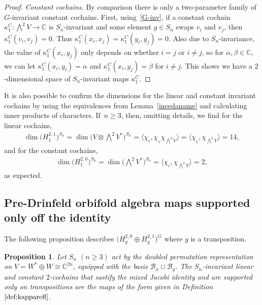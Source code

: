 \documentclass[10pt,a4paper]{amsart}
\numberwithin{equation}{section}
\newtheorem{Proposition}[Theorem]{Proposition}
 { \theoremstyle{definition}
\newtheorem{Definition}[Theorem]{Definition}
\newtheorem{Remark}[Theorem]{Remark}
\newtheorem{case}{Case}}
\begin{document}
\begin{proof}
\textit{Constant cochains.}
By comparison there is only a two-parameter family of $G$-invariant constant cochains.
First, using~\eqref{G-inv}, if a constant cochain $\kappa_1^C\colon \bigwedge^2 V\to \mathbb{C}$ is
$S_n$-invariant and some element $g \in S_n$ swaps $v_i$ and $v_j$, then $\kappa_1^C(v_i,v_j)=0$.
Thus $\kappa_1^C(x_i,x_j)=\kappa_1^C(y_i,y_j)=0$.
Also due to $S_n$-invariance, the value of $\kappa_1^C(x_i,y_j)$ only depends on whether $i=j$ or $i\neq j$, so for $\alpha,\beta\in\mathbb{C}$, we can let $\kappa_1^C(x_i,y_i)=\alpha$ and $\kappa_1^C(x_i,y_j)=\beta$ for $i\neq j$. This shows we have a $2$-dimensional space of $S_n$-invariant maps $\kappa_1^C$.
\end{proof}

\begin{Remark}
It is also possible to confirm the dimensions for the linear and constant invariant cochains by using the equivalences from Lemma~\ref{ineedaname} and calculating inner products of characters. If~$n\geq 3$, then, omitting details, we find
for the linear cochains,
\begin{gather*}
\dim\big(H_1^{2,1}\big)^{S_n}=\dim\Big(V\otimes\bigwedge\nolimits^{\! 2} V^*\Big)^{S_n}=\big\langle \chi_{\iota},\chi_{_V}\chi_{\bigwedge^2 V}\big\rangle=\big\langle\chi_{_V},\chi_{\bigwedge^2 V}\big\rangle =14,
\end{gather*}
and for the constant cochains,
\begin{gather*}
\dim \big(H_1^{2,0}\big)^{S_n}=\dim\Big(\bigwedge\nolimits^{\! 2} V^*\Big)^{S_n}=\langle\chi_{\iota},\chi_{\bigwedge^2 V} \rangle=2,
\end{gather*}
as expected.
\end{Remark}

\subsection{Pre-Drinfeld orbifold algebra maps supported only off the identity}

The following proposition describes $\big(H_g^{2,0}\oplus H_g^{2,1}\big)^G$
where $g$ is a transposition.

\begin{Proposition}
\label{prop:kapparefl}
Let $S_n$ $(n \geq 3)$ act by the doubled permutation representation on $V=W^* \oplus W \cong \mathbb{C}^{2n}$, equipped with the
basis $\mathcal{B}_x \cup \mathcal{B}_y$.
The $S_n$-invariant linear and constant $2$-cochains that sastify the mixed Jacobi identity and are supported only on transpositions are the maps of the form given in Definition~$\ref{def:kapparefl}$.
\end{Proposition}
\end{document}
